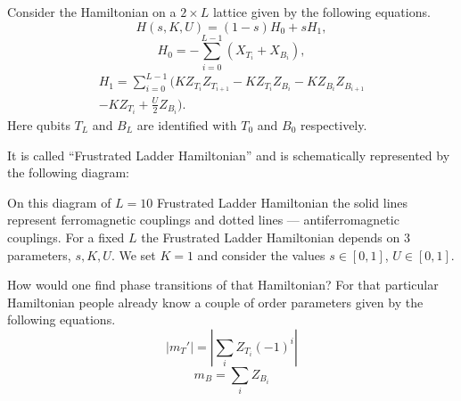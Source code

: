 \documentclass[
  american,aps,pra,reprint,floatfix,nofootinbib,superscriptaddress
]{revtex4-2}
\newcommand{\abs}[1]{\left|#1\right|}
\newcommand{\absmt}{\abs{m_{T}'}}
\begin{document}
Consider the Hamiltonian
on a $2 \times L$ lattice given by the following equations.
\begin{equation}
  \label{eq:Hladder.1}
  H(s,K,U) = (1-s) H_0 + s H_1,
\end{equation}
\begin{equation}
  \label{eq:Hladder.2}
  H_0 = -\sum_{i=0}^{L-1} (X_{T_i} + X_{B_i}),
\end{equation}
\begin{multline}
  \label{eq:Hladder.3}
  H_1 = \sum_{i=0}^{L-1} \biggl(K Z_{T_i} Z_{T_{i+1}} - K Z_{T_i} Z_{B_i}
    - K Z_{B_i} Z_{B_{i+1}} \\
  - K Z_{T_i} + \frac{U}{2} Z_{B_i}\biggr).
\end{multline}
Here qubits $T_L$ and $B_L$ are identified with $T_0$ and $B_0$ respectively.

It is called ``Frustrated Ladder Hamiltonian'' and is schematically represented
by the following diagram:
\begin{center}
  \pgfmathparse{\columnwidth/10.7cm}%
  \edef\tikzscale{\pgfmathresult}%
\end{center}
On this diagram of $L=10$ Frustrated Ladder Hamiltonian
the solid lines represent ferromagnetic couplings and
dotted lines --- antiferromagnetic couplings. For a fixed $L$
the Frustrated Ladder Hamiltonian depends on 3 parameters, $s, K, U$.
We set $K=1$ and consider the values $s\in[0,1]$, $U\in[0,1]$.

How would one find phase transitions of that Hamiltonian? For that particular
Hamiltonian people already know a couple of order parameters given by the
following equations.
\begin{equation}
  \label{eq:mt}
  \absmt = \abs{\sum_i Z_{T_i}(-1)^i}
\end{equation}
\begin{equation}
  \label{eq:mb}
  m_B = \sum_i Z_{B_i}
\end{equation}
\end{document}
